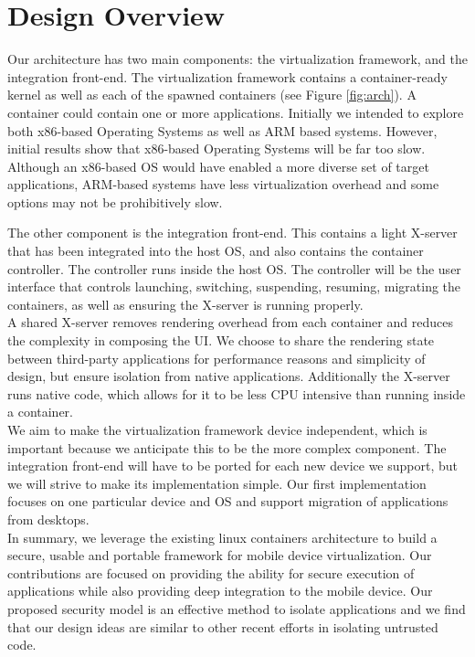 \section{Design Overview}
\label{sec:overview}
Our architecture has two main components: the virtualization framework, and the integration front-end.  The virtualization framework contains a container-ready kernel as well as each of the spawned containers (see Figure \ref{fig:arch}).  A container could contain one or more applications.  Initially we intended to explore both x86-based Operating Systems as well as ARM based systems.  However, initial results show that x86-based Operating Systems will be far too slow.  Although an x86-based OS would have enabled a more diverse set of target applications, ARM-based systems have less virtualization overhead and some options may not be prohibitively slow.

The other component is the integration front-end. This contains a light X-server that has been integrated into the host OS, and also contains the container controller. The controller runs inside the host OS. The controller will be the user interface that controls launching, switching, suspending, resuming, migrating the containers, as well as ensuring the X-server is running properly. \\
A shared X-server removes rendering overhead from each container and reduces the complexity in composing the UI. We choose to share the rendering state between third-party applications for performance reasons and simplicity of design, but ensure isolation from native applications. Additionally the X-server runs native code, which allows for it to be less CPU intensive than running inside a container. \\

We aim to make the virtualization framework device independent, which is important because we anticipate this to be the more complex component. The integration front-end will have to be ported for each new device we support, but we will strive to make its implementation simple. Our first implementation focuses on one particular device and OS and support  migration of applications from desktops. \\

In summary, we leverage the existing linux containers architecture to build a secure, usable and portable framework for mobile device virtualization. Our contributions are focused on providing the ability for secure execution of applications while also providing deep integration to the mobile device. Our proposed security model is an effective method to isolate applications and we find that our design ideas are similar to other recent efforts \cite{grier2008secure} in isolating untrusted code. 
